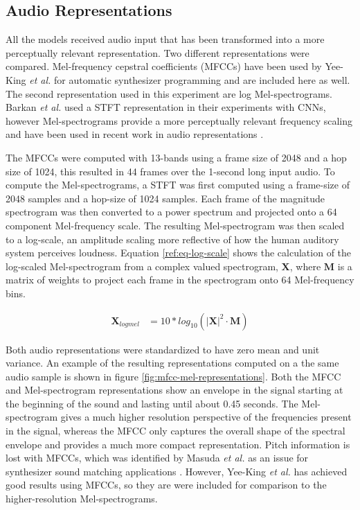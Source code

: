 \subsection{Audio Representations}
All the models received audio input that has been transformed into a more perceptually relevant representation. Two different representations were compared. Mel-frequency cepstral coefficients (MFCCs) have been used by Yee-King \textit{et al.} \cite{yee2011automatic, yee2018automatic} for automatic synthesizer programming and are included here as well. The second representation used in this experiment are log Mel-spectrograms. Barkan \textit{et al.} \cite{barkan2019inversynth} used a STFT representation in their experiments with CNNs, however Mel-spectrograms provide a more perceptually relevant frequency scaling and have been used in recent work in audio representations \cite{cramer:learnmore:icassp:19, hershey2017cnn}. 

The MFCCs were computed with 13-bands using a frame size of 2048 and a hop size of 1024, this resulted in 44 frames over the 1-second long input audio. To compute the Mel-spectrograms, a STFT was first computed using a frame-size of 2048 samples and a hop-size of 1024 samples. Each frame of the magnitude spectrogram was then converted to a power spectrum and projected onto a 64 component Mel-frequency scale. The resulting Mel-spectrogram was then scaled to a log-scale, an amplitude scaling more reflective of how the human auditory system perceives loudness. Equation \ref{ref:eq-log-scale} shows the calculation of the log-scaled Mel-spectrogram from a complex valued spectrogram, $\textbf{X}$, where $\textbf{M}$ is a matrix of weights to project each frame in the spectrogram onto 64 Mel-frequency bins.

\begin{align}\label{ref:eq-log-scale}
    \textbf{X}_{logmel} &= 10*log_{10}(|\textbf{X}|^2 \cdot \textbf{M})
\end{align}

Both audio representations were standardized to have zero mean and unit variance. An example of the resulting representations computed on a the same audio sample is shown in figure \ref{fig:mfcc-mel-representations}. Both the MFCC and Mel-spectrogram representations show an envelope in the signal starting at the beginning of the sound and lasting until about 0.45 seconds. The Mel-spectrogram gives a much higher resolution perspective of the frequencies present in the signal, whereas the MFCC only captures the overall shape of the spectral envelope and provides a much more compact representation. Pitch information is lost with MFCCs, which was identified by Masuda \textit{et al.} as an issue for synthesizer sound matching applications \cite{masudo2021quality}. However, Yee-King \textit{et al.} has achieved good results using MFCCs, so they are were included for comparison to the higher-resolution Mel-spectrograms.

